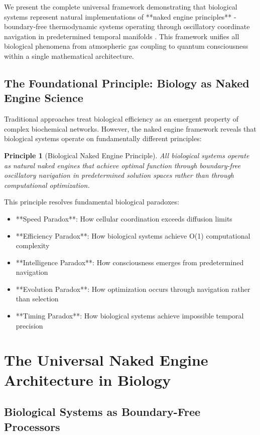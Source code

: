 \documentclass[12pt,a4paper]{article}
\newtheorem{principle}[theorem]{Principle}
\begin{document}
We present the complete universal framework demonstrating that biological systems represent natural implementations of **naked engine principles** - boundary-free thermodynamic systems operating through oscillatory coordinate navigation in predetermined temporal manifolds \citep{sachikonye2024naked}. This framework unifies all biological phenomena from atmospheric gas coupling to quantum consciousness within a single mathematical architecture.

\subsection{The Foundational Principle: Biology as Naked Engine Science}

Traditional approaches treat biological efficiency as an emergent property of complex biochemical networks. However, the naked engine framework reveals that biological systems operate on fundamentally different principles:

\begin{principle}[Biological Naked Engine Principle]
All biological systems operate as natural naked engines that achieve optimal function through boundary-free oscillatory navigation in predetermined solution spaces rather than through computational optimization.
\end{principle}

This principle resolves fundamental biological paradoxes:
\begin{itemize}
\item **Speed Paradox**: How cellular coordination exceeds diffusion limits
\item **Efficiency Paradox**: How biological systems achieve O(1) computational complexity  
\item **Intelligence Paradox**: How consciousness emerges from predetermined navigation
\item **Evolution Paradox**: How optimization occurs through navigation rather than selection
\item **Timing Paradox**: How biological systems achieve impossible temporal precision
\end{itemize}

\section{The Universal Naked Engine Architecture in Biology}

\subsection{Biological Systems as Boundary-Free Processors}
\end{document}
